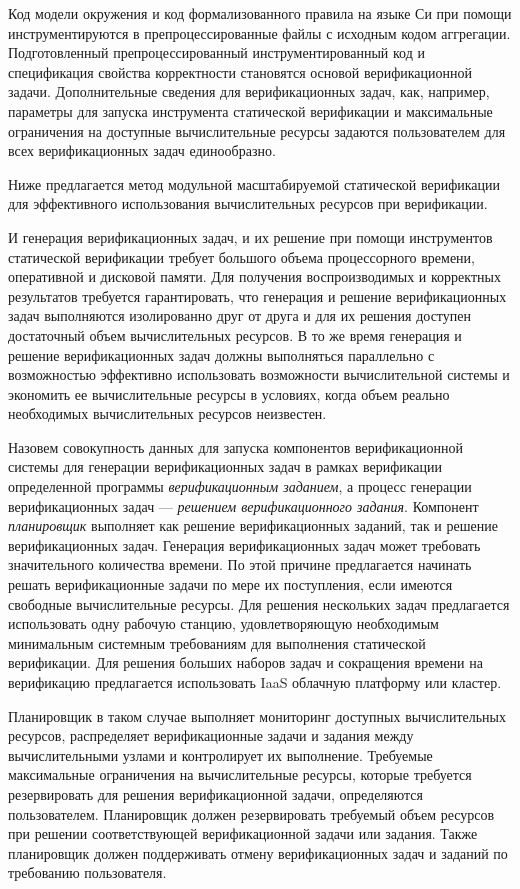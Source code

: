 \documentclass[%
candidate,     %
href,        %
colorlinks,  %
]{disser}
\begin{document}
Код модели окружения и код формализованного правила на языке Си при помощи инструментируются в препроцессированные файлы с исходным кодом аггрегации.
Подготовленный препроцессированный инструментированный код и спецификация свойства корректности становятся основой верификационной задачи.
Дополнительные сведения для верификационных задач, как, например, параметры для запуска инструмента статической верификации и максимальные ограничения на доступные вычислительные ресурсы задаются пользователем для всех верификационных задач единообразно.  

Ниже предлагается метод модульной масштабируемой статической верификации для эффективного использования вычислительных ресурсов при верификации.

И генерация верификационных задач, и их решение при помощи инструментов статической верификации требует большого объема процессорного времени, оперативной и дисковой памяти.
Для получения воспроизводимых и корректных результатов требуется гарантировать, что генерация и решение верификационных задач выполняются изолированно друг от друга и для их решения доступен достаточный объем вычислительных ресурсов.
В то же время генерация и решение верификационных задач должны выполняться параллельно с возможностью эффективно использовать возможности вычислительной системы и экономить ее вычислительные ресурсы в условиях, когда объем реально необходимых вычислительных ресурсов неизвестен.

Назовем совокупность данных для запуска компонентов верификационной системы для генерации верификационных задач в рамках верификации определенной программы  \textit{верификационным заданием}, а процесс генерации верификационных задач --- \textit{решением верификационного задания}.
Компонент \textit{планировщик} выполняет как решение верификационных заданий, так и решение верификационных задач.
Генерация верификационных задач может требовать значительного количества времени.
По этой причине предлагается начинать решать верификационные задачи по мере их поступления, если имеются свободные вычислительные ресурсы.
Для решения нескольких задач предлагается использовать одну рабочую станцию, удовлетворяющую необходимым минимальным системным требованиям для выполнения статической верификации.
Для решения больших наборов задач и сокращения времени на верификацию предлагается использовать IaaS облачную платформу или кластер.

Планировщик в таком случае выполняет мониторинг доступных вычислительных ресурсов, распределяет верификационные задачи и задания между вычислительными узлами и контролирует их выполнение.
Требуемые максимальные ограничения на вычислительные ресурсы, которые требуется резервировать для решения верификационной задачи, определяются пользователем.
Планировщик должен резервировать требуемый объем ресурсов при решении соответствующей верификационной задачи или задания.
Также планировщик должен поддерживать отмену верификационных задач и заданий по требованию пользователя.
\end{document}
